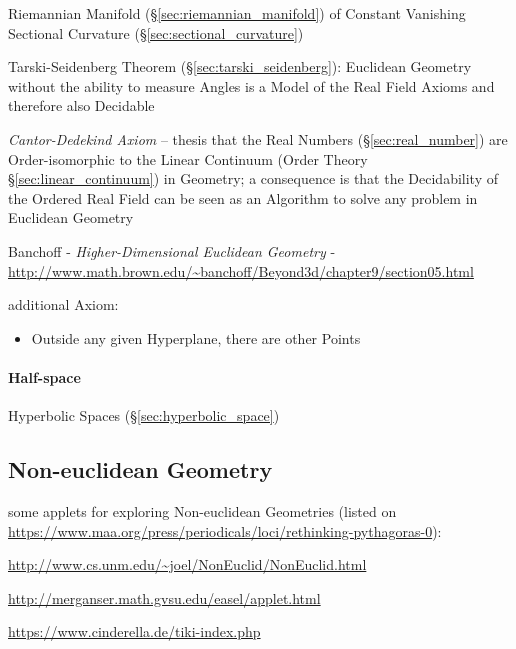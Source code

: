 Riemannian Manifold (\S\ref{sec:riemannian_manifold}) of Constant Vanishing
Sectional Curvature (\S\ref{sec:sectional_curvature})

Tarski-Seidenberg Theorem (\S\ref{sec:tarski_seidenberg}): Euclidean Geometry
without the ability to measure Angles is a Model of the Real Field Axioms
and therefore also Decidable

\emph{Cantor-Dedekind Axiom} -- thesis that the Real Numbers
(\S\ref{sec:real_number}) are Order-isomorphic to the Linear Continuum (Order
Theory \S\ref{sec:linear_continuum}) in Geometry; a consequence is that the
Decidability of the Ordered Real Field can be seen as an Algorithm to solve any
problem in Euclidean Geometry

\asterism

Banchoff - \emph{Higher-Dimensional Euclidean Geometry} -
\url{http://www.math.brown.edu/~banchoff/Beyond3d/chapter9/section05.html}

additional Axiom:

\begin{itemize}
  \item Outside any given Hyperplane, there are other Points
\end{itemize}



\paragraph{Half-space}\label{sec:half_space}\hfill

Hyperbolic Spaces (\S\ref{sec:hyperbolic_space})



\subsection{Non-euclidean Geometry}\label{sec:noneuclidean_geometry}

some applets for exploring Non-euclidean Geometries (listed on
\url{https://www.maa.org/press/periodicals/loci/rethinking-pythagoras-0}):

\url{http://www.cs.unm.edu/~joel/NonEuclid/NonEuclid.html}

\url{http://merganser.math.gvsu.edu/easel/applet.html}

\url{https://www.cinderella.de/tiki-index.php}

